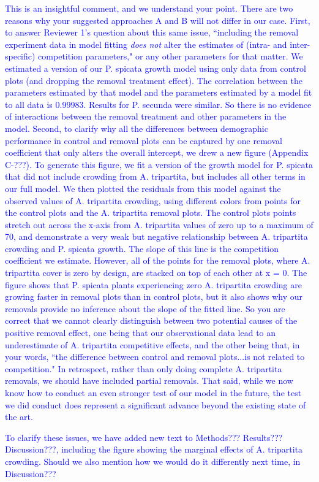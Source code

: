 \documentclass[12pt]{article}
\newcommand{\response}{\textcolor{blue}}
\begin{document}
\response{ This is an insightful comment, and we understand your point. There are two reasons why your suggested approaches A and B will not differ in our case. First, to answer Reviewer 1's question about this same issue, ``including the removal experiment data in model fitting \emph{does not} alter the estimates of (intra- and inter-specific) competition parameters," or any other parameters for that matter. We estimated a version of our P. spicata growth model using only data from control plots (and dropping the removal treatment effect). The correlation between the parameters estimated by that model and the parameters estimated by a model fit to all data is 0.99983. Results for P. secunda were similar.  So there is no evidence of interactions between the removal treatment and other parameters in the model. Second, to clarify why all the differences between demographic performance in control and removal plots can be captured by one removal coefficient that only alters the overall intercept, we drew a new figure (Appendix C-???). To generate this figure, we fit a version of the growth model for P. spicata that did not include crowding from A. tripartita, but includes all other terms in our full model. We then plotted the residuals from this model against the observed values of A. tripartita crowding, using different colors from points for the control plots and the A. tripartita removal plots. The control plots points stretch out across the x-axis from A. tripartita values of zero up to a maximum of 70, and demonstrate a very weak but negative relationship between A. tripartita crowding and P. spicata growth. The slope of this line is the competition coefficient we estimate. However, all of the points for the removal plots, where A. tripartita cover is zero by design, are stacked on top of each other at x = 0. The figure shows that P. spicata plants experiencing zero A. tripartita crowding are growing faster in removal plots than in control plots, but it also shows why our removals provide no inference about the slope of the fitted line. So you are correct that we cannot clearly distinguish between two potential causes of the positive removal effect, one being that our observational data lead to an underestimate of A. tripartita competitive effects, and the other being that, in your words, ``the difference between control and removal plots...is not related to competition."  In retrospect, rather than only doing complete A. tripartita removals, we should have included partial removals. That said, while we now know how to conduct an even stronger test of our model in the future, the test we did conduct does represent a significant advance beyond the existing state of the art.

To clarify these issues, we have added new text to Methods??? Results??? Discussion???, including the figure showing the marginal effects of A. tripartita crowding. Should we also mention how we would do it differently next time, in Discussion???}
\end{document}
